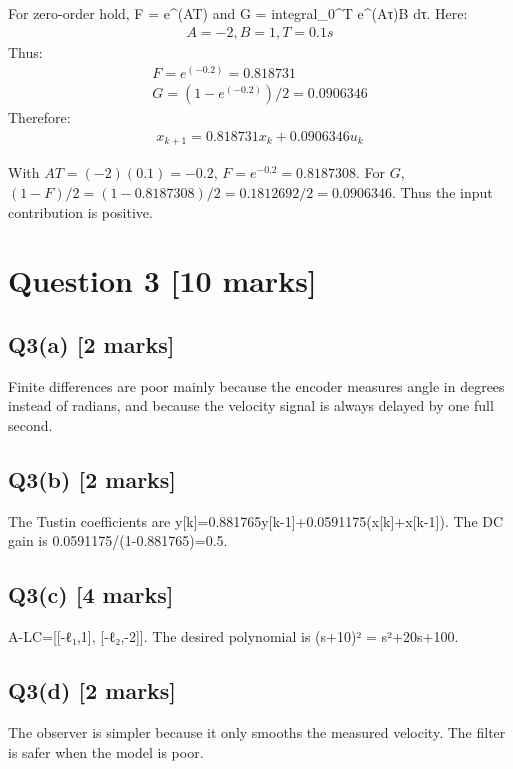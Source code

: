 \documentclass[11pt,a4paper]{article}
\begin{document}
For zero-order hold, F = e\textasciicircum{}(AT) and G = integral\_0\textasciicircum{}T e\textasciicircum{}(Aτ)B dτ.
Here:\[\begin{aligned}A = -2, B = 1, T = 0.1 s\end{aligned}\]
Thus:\[\begin{aligned}F = e^(-0.2) = 0.818731\\ G = (1-e^(-0.2))/2 = 0.0906346\end{aligned}\]
Therefore:\[\begin{aligned}x_{k+1} = 0.818731 x_k + 0.0906346 u_k\end{aligned}\]\par\smallskip With $AT=(-2)(0.1)=-0.2$, $F=e^{-0.2}=0.8187308$. For $G$, $(1-F)/2=(1-0.8187308)/2=0.1812692/2=0.0906346$. Thus the input contribution is positive.

\section*{Question 3 \hfill [10 marks]}
\subsection*{Q3(a) \hfill [2 marks]}

Finite differences are poor mainly because the encoder measures angle in degrees instead of radians, and because the velocity signal is always delayed by one full second.

\subsection*{Q3(b) \hfill [2 marks]}

The Tustin coefficients are y[k]=0.881765y[k-1]+0.0591175(x[k]+x[k-1]).
The DC gain is 0.0591175/(1-0.881765)=0.5.

\subsection*{Q3(c) \hfill [4 marks]}

A-LC=[[-ℓ₁,1], [-ℓ₂,-2]].
The desired polynomial is (s+10)² = s²+20s+100.

\subsection*{Q3(d) \hfill [2 marks]}

The observer is simpler because it only smooths the measured velocity.
The filter is safer when the model is poor.
\end{document}

